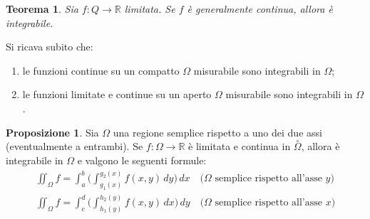 \documentclass[a4paper]{book}
\numberwithin{equation}{section}
\theoremstyle{plain}
\newtheorem{teor}{Teorema}[section]
\theoremstyle{definition}
\newtheorem{prop}{Proposizione}[section]
\theoremstyle{remark}
\theoremstyle{example}
\begin{document}
\begin{teor}
	Sia $f \colon Q \to \mathbb{R}$ limitata. Se $f$ è generalmente continua, allora è integrabile.
\end{teor}

Si ricava subito che:
\begin{enumerate}
	\item le funzioni continue su un compatto $\Omega$ misurabile sono integrabili in $\Omega$;
	\item le funzioni limitate e continue su un aperto $\Omega$ misurabile sono integrabili in $\Omega$.
\end{enumerate}

\begin{prop}
	Sia $\Omega$ una regione semplice rispetto a uno dei due assi (eventualmente a entrambi). Se $f \colon \Omega \to \mathbb{R}$ è limitata e continua in $\overset{\circ}{\Omega}$, allora è integrabile in $\Omega$ e valgono le seguenti formule:
	\begin{align}
		\iint_{\Omega} f = \int_a^b \biggl( \int_{g_1(x)}^{g_2(x)} f(x, y) \, dy \biggr) \, dx \quad \text{($\Omega$ semplice rispetto all'asse $y$)} \\
		\iint_{\Omega} f = \int_c^d \biggl(\int_{h_1(y)}^{h_2(y)} f(x,y) \, dx \biggr) \, dy \quad \text{($\Omega$ semplice rispetto all'asse $x$)}
	\end{align}
\end{prop}
\end{document}
